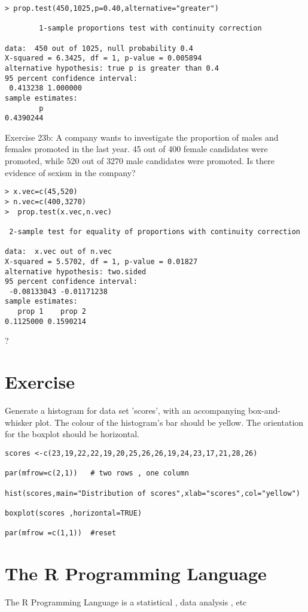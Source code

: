 \documentclass[a4paper,12pt]{article}
\begin{document}
\begin{itemize}
\begin{verbatim}
> prop.test(450,1025,p=0.40,alternative="greater")

        1-sample proportions test with continuity correction

data:  450 out of 1025, null probability 0.4
X-squared = 6.3425, df = 1, p-value = 0.005894
alternative hypothesis: true p is greater than 0.4
95 percent confidence interval:
 0.413238 1.000000
sample estimates:
        p
0.4390244
\end{verbatim}

Exercise 23b:  A company wants to investigate the proportion of males and females promoted in the last year. 45 out of 400 female candidates were promoted, while 520 out of 3270 male candidates were promoted. Is there evidence of sexism in the company?
\begin{verbatim}
> x.vec=c(45,520)
> n.vec=c(400,3270)
>  prop.test(x.vec,n.vec)

 2-sample test for equality of proportions with continuity correction

data:  x.vec out of n.vec
X-squared = 5.5702, df = 1, p-value = 0.01827
alternative hypothesis: two.sided
95 percent confidence interval:
 -0.08133043 -0.01171238
sample estimates:
   prop 1    prop 2
0.1125000 0.1590214
\end{verbatim}

?
\section{Exercise}

Generate a histogram for data set 'scores', with an accompanying box-and-whisker plot.
The colour of the histogram's bar should be yellow. The orientation for the boxplot should be horizontal.

\begin{verbatim}
scores <-c(23,19,22,22,19,20,25,26,26,19,24,23,17,21,28,26)

par(mfrow=c(2,1)) 	# two rows , one column

hist(scores,main="Distribution of scores",xlab="scores",col="yellow")

boxplot(scores ,horizontal=TRUE)

par(mfrow =c(1,1)) 	#reset
\end{verbatim}
\section{The R Programming Language}

The R Programming Language is a statistical , data analysis , etc


\end{itemize}
\end{document}
